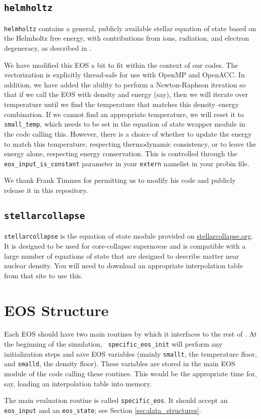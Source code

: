 \subsection {\tt helmholtz} 

{\tt helmholtz} contains a general, publicly available stellar
  equation of state based on the Helmholtz free energy, with
  contributions from ions, radiation, and electron degeneracy, as
  described in \cite{timmes:1999,timmes:2000,flash}.

We have modified this EOS a bit to fit within the context of our
codes. The vectorization is explicitly thread-safe for use with OpenMP
and OpenACC.  In addition, we have added the ability to perform a
Newton-Raphson iteration so that if we call the EOS with density and
energy (say), then we will iterate over temperature until we find the
temperature that matches this density--energy combination. If we
cannot find an appropriate temperature, we will reset it to {\tt
  small\_temp}, which needs to be set in the equation of state wrapper
module in the code calling this. However, there is a choice of whether
to update the energy to match this temperature, respecting
thermodynamic consistency, or to leave the energy alone, respecting
energy conservation. This is controlled through the
\texttt{eos\_input\_is\_constant} parameter in your \texttt{extern}
namelist in your probin file.

We thank Frank Timmes for permitting us to modify his code and
publicly release it in this repository.

\subsection {\tt stellarcollapse} 

{\tt stellarcollapse} is the equation of state module provided
  on \href{stellarcollapse.org}{stellarcollapse.org}. It is designed
  to be used for core-collapse supernovae and is compatible with a
  large number of equations of state that are designed to describe
  matter near nuclear density. You will need to download an
  appropriate interpolation table from that site to use this.




\section{EOS Structure}

Each EOS should have two main routines by which it interfaces to the
rest of \castro.  At the beginning of the simulation, {\tt
  specific\_eos\_init} will perform any initialization steps and save
EOS variables (mainly \texttt{smallt}, the temperature floor, and
\texttt{smalld}, the density floor). These variables are stored in the
main EOS module of the code calling these routines. This would be the
appropriate time for, say, loading an interpolation table into memory.

The main evaluation routine is called {\tt specific\_eos}. It should
accept an {\tt eos\_input} and an {\tt eos\_state}; see Section
\ref{sec:data_structures}.



